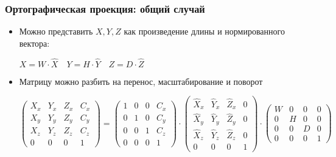\documentclass{beamer}
\begin{document}
\begin{frame}[fragile]
\frametitle{Ортографическая проекция: общий случай}
\begin{itemize}
\item Можно представить \begin{math}X, Y, Z\end{math} как произведение длины и нормированного вектора:
\begin{center}
\begin{math}X = W \cdot \hat X \quad Y = H \cdot \hat Y \quad Z = D \cdot \hat Z\end{math}
\end{center}
\pause
\item Матрицу можно разбить на перенос, масштабирование и поворот
\begin{center}
\begin{math}
\begin{pmatrix}
X_x & Y_x & Z_x & C_x \\
X_y & Y_y & Z_y & C_y \\
X_z & Y_z & Z_z & C_z \\
0 & 0 & 0 & 1
\end{pmatrix}
=
\begin{pmatrix}
1 & 0 & 0 & C_x \\
0 & 1 & 0 & C_y \\
0 & 0 & 1 & C_z \\
0 & 0 & 0 & 1
\end{pmatrix}
\cdot
\begin{pmatrix}
\hat X_x & \hat Y_x & \hat Z_x & 0 \\
\hat X_y & \hat Y_y & \hat Z_y & 0 \\
\hat X_z & \hat Y_z & \hat Z_z & 0 \\
0 & 0 & 0 & 1
\end{pmatrix}
\cdot
\begin{pmatrix}
W & 0 & 0 & 0 \\
0 & H & 0 & 0 \\
0 & 0 & D & 0 \\
0 & 0 & 0 & 1
\end{pmatrix}
\end{math}
\end{center}
\end{itemize}
\end{frame}
\end{document}
